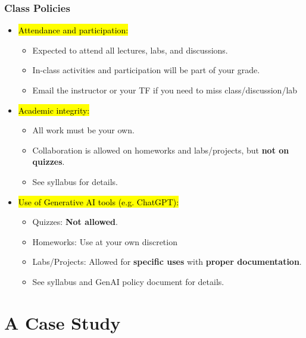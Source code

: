 \documentclass[slidestop,compress,mathserif]{beamer}
\begin{document}
\begin{frame}
	\frametitle{Class Policies} 
	\begin{itemize}
		\item \hl{Attendance and participation:} 
		\begin{itemize}
			\item Expected to attend all lectures, labs, and discussions. 
			\item In-class activities and participation will be part of your grade.
			\item Email the instructor or your TF if you need to miss class/discussion/lab
		\end{itemize}
		\item \hl{Academic integrity:} 
		\begin{itemize}
			\item All work must be your own. 
			\item Collaboration is allowed on homeworks and labs/projects, but \textbf{not on quizzes}. 
			\item See syllabus for details.
		\end{itemize}
		\item \hl{Use of Generative AI tools (e.g. ChatGPT):}
		\begin{itemize}
			\item Quizzes: \textbf{Not allowed}.
			\item Homeworks: Use at your own discretion
			\item Labs/Projects: Allowed for \textbf{specific uses} with \textbf{proper documentation}.
			\item See syllabus and GenAI policy document for details.
		\end{itemize}
	\end{itemize}
\end{frame}


\section{A Case Study}
\end{document}
